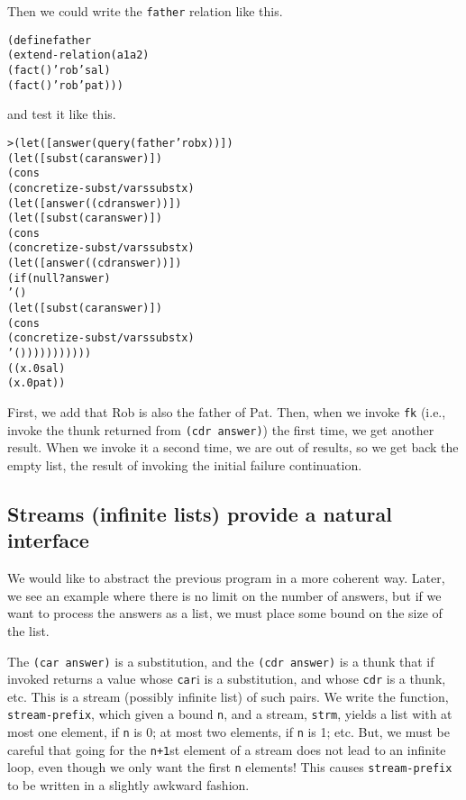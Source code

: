 Then we could write the \texttt{father} relation like this.

\begin{alltt}
(define father
  (extend-relation (a1 a2)
    (fact () 'rob 'sal)
    (fact () 'rob 'pat)))
\end{alltt}

\noindent
and test it like this.

\begin{alltt}
> (let ([answer (query (father 'rob x))])
    (let ([subst (car answer)])
      (cons
        (concretize-subst/vars subst x)
        (let ([answer ((cdr answer))])
          (let ([subst (car answer)])
            (cons
              (concretize-subst/vars subst x)
              (let ([answer ((cdr answer))])
                (if (null? answer)
                  '()
                  (let ([subst (car answer)])
                    (cons
                      (concretize-subst/vars subst x)
                      '()))))))))))
((x.0 sal)
 (x.0 pat))
\end{alltt}
\noindent
First, we add that Rob is also the father of Pat.  Then, when we
invoke \texttt{fk} (i.e., invoke the thunk returned from \texttt{(cdr
answer)}) the first time, we get another result.  When we invoke it a
second time, we are out of results, so we get back the empty list, the
result of invoking the initial failure continuation.

\subsection{Streams (infinite lists) provide a natural interface}

We would like to abstract the previous program in a more coherent way.
Later, we see an example where there is no limit on the number of
answers, but if we want to process the answers as a list, we must
place some bound on the size of the list.

The \texttt{(car answer)} is a substitution, and the \texttt{(cdr
answer)} is a thunk that if invoked returns a value whose \texttt{car}i
is a substitution, and whose \texttt{cdr} is a thunk, etc.  This is a
stream (possibly infinite list) of such pairs.  We write the function,
\texttt{stream-prefix}, which given a bound \texttt{n}, and a stream,
\texttt{strm}, yields a list with at most one element, if \texttt{n}
is 0; at most two elements, if \texttt{n} is 1; etc.  But, we must be
careful that going for the \texttt{n+1}st element of a stream does not
lead to an infinite loop, even though we only want the first
\texttt{n} elements! This causes \texttt{stream-prefix} to be written
in a slightly awkward fashion.

